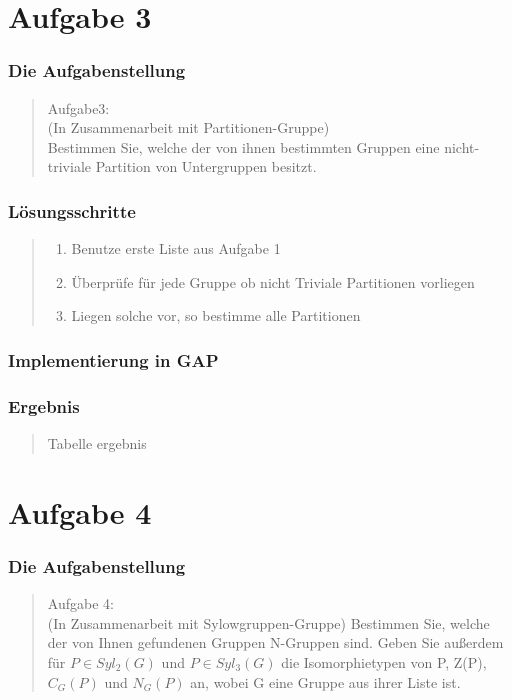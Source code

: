 \documentclass{beamer}
\begin{document}
\section{Aufgabe 3}

\begin{frame}
	\frametitle{Die Aufgabenstellung}
	\begin{quote}
	Aufgabe3:\\
	(In Zusammenarbeit mit Partitionen-Gruppe)\\
	Bestimmen Sie, welche der von ihnen bestimmten Gruppen eine nicht-triviale Partition von Untergruppen besitzt.

	\end{quote}
\end{frame}

\begin{frame}
	\frametitle{Lösungsschritte}
	\begin{quote}
	 \begin{enumerate}
	  \item Benutze erste Liste aus Aufgabe 1
	  \item Überprüfe für jede Gruppe ob nicht Triviale Partitionen vorliegen
	  \item Liegen solche vor, so bestimme alle Partitionen
	 \end{enumerate}

		 
	\end{quote}
\end{frame}

\begin{frame}
	\frametitle{Implementierung in GAP}
	\begin{quote}
	 

		 
	\end{quote}
\end{frame}

\begin{frame}
	\frametitle{Ergebnis}
	\begin{quote}
	 Tabelle ergebnis
		 
	\end{quote}
\end{frame}

\section{Aufgabe 4}

\begin{frame}
	\frametitle{Die Aufgabenstellung}
	\begin{quote}
	Aufgabe 4:\\
	(In Zusammenarbeit mit Sylowgruppen-Gruppe) Bestimmen Sie, welche der von Ihnen gefundenen Gruppen N-Gruppen sind. Geben Sie außerdem für 
	$ P \in Syl_2(G) $ und $ P \in Syl_3(G) $ die Isomorphietypen von P, Z(P), $ C_G(P) $ und $ N_G(P) $ an, wobei G eine Gruppe aus ihrer Liste ist.
	\end{quote}
\end{frame}
\end{document}
